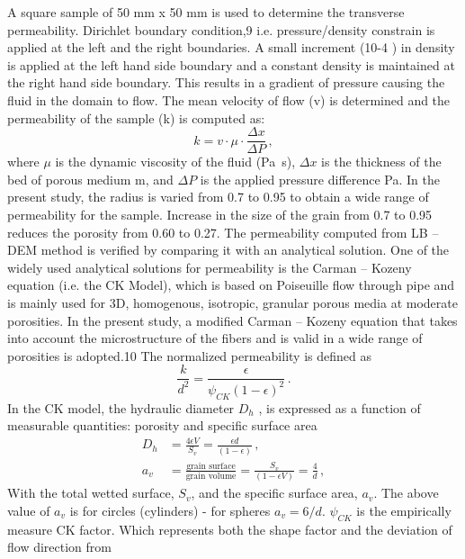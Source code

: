 A square sample of 50 mm x 50 mm is used to determine the transverse 
permeability. Dirichlet boundary condition,9 i.e. pressure/density constrain is 
applied at the left and the right boundaries. A small increment (10-4 ) in 
density is applied at the left hand side boundary and a constant density is 
maintained at the right hand side boundary. This results in a gradient of 
pressure causing the fluid in the domain to flow. The mean velocity of flow (v) 
is determined and the permeability of the sample (k) is computed as:
%
\begin{equation}
k=v\cdot\mu\cdot\frac{\Delta x}{\Delta P} \,,
\end{equation}
%
where $\mu$ is the dynamic viscosity of the fluid (\si{\Pa\s}), $\Delta x$ is 
the thickness of the bed of porous medium \si{\m}, and $\Delta P$ is the 
applied pressure difference \si{\Pa}.  In the present study, the radius is 
varied from 0.7 to 0.95 to obtain a 
wide range of permeability for the sample. Increase in the size of the grain 
from 0.7 to 0.95 reduces the porosity from 0.60 to 0.27. The permeability 
computed from LB – DEM method is verified by comparing it with an analytical 
solution. One of the widely used analytical solutions for permeability is the 
Carman – Kozeny equation (i.e. the CK Model), which is based on Poiseuille flow 
through pipe and is mainly used for 3D, homogenous, isotropic, granular porous 
media at moderate porosities. In the present study, a modified Carman – Kozeny 
equation that takes into account the microstructure of the fibers and is valid 
in a wide range of porosities is adopted.10 The normalized permeability is 
defined as
\begin{equation}
\frac{k}{d^2} = \frac{\epsilon}{\psi_{CK}(1-\epsilon)^2} \,.
\end{equation}
%
In the CK model, the hydraulic diameter $D_h$ , is expressed as a function of 
measurable quantities: porosity and specific surface area
\begin{align}
D_h & = \frac{4\epsilon V}{S_v}=\frac{\epsilon d}{(1 - \epsilon)} \,, \\
a_v & = \frac{\mbox{grain surface}}{\mbox{grain volume}} = 
\frac{S_v}{(1-\epsilon V)} = \frac{4}{d} \,,
\end{align}
With the total wetted surface, $S_v$, and the specific surface area, $a_v$. The 
above value of $a_v$ is for circles (cylinders) - for spheres $a_v = 6/d$. 
$\psi_{CK}$ is the empirically  measure CK factor.
Which represents both the shape factor and the deviation of flow direction from 
